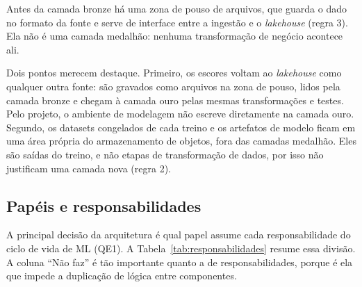 Antes da camada bronze há uma zona de pouso de arquivos, que guarda o dado no formato da fonte e serve de interface entre a ingestão e o \textit{lakehouse} (regra 3). Ela não é uma camada medalhão: nenhuma transformação de negócio acontece ali.

Dois pontos merecem destaque. Primeiro, os escores voltam ao \textit{lakehouse} como qualquer outra fonte: são gravados como arquivos na zona de pouso, lidos pela camada bronze e chegam à camada ouro pelas mesmas transformações e testes. Pelo projeto, o ambiente de modelagem não escreve diretamente na camada ouro. Segundo, os datasets congelados de cada treino e os artefatos de modelo ficam em uma área própria do armazenamento de objetos, fora das camadas medalhão. Eles são saídas do treino, e não etapas de transformação de dados, por isso não justificam uma camada nova (regra 2).

\subsection{Papéis e responsabilidades}

A principal decisão da arquitetura é qual papel assume cada responsabilidade do ciclo de vida de ML (QE1). A Tabela~\ref{tab:responsabilidades} resume essa divisão. A coluna ``Não faz'' é tão importante quanto a de responsabilidades, porque é ela que impede a duplicação de lógica entre componentes.

